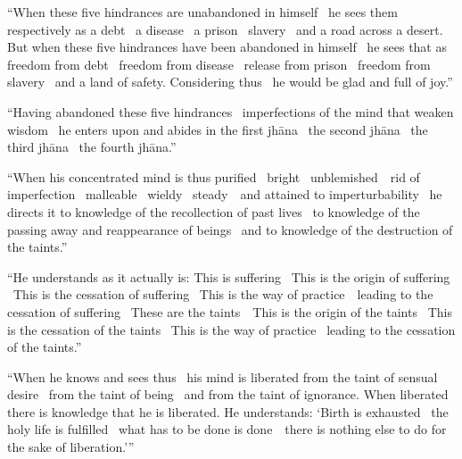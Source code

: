 \suttaRef{[MN 107]}

\begin{english-only-justify}
  ``When these five hindrances are unabandoned in himself \breathmark\ he sees them respectively as a debt \breathmark\ a disease \breathmark\ a prison \breathmark\ slavery \breathmark\ and a road across a desert. But when these five hindrances have been abandoned in himself \breathmark\ he sees that as freedom from debt \breathmark\ freedom from disease \breathmark\ release from prison \breathmark\ freedom from slavery \breathmark\ and a land of safety. Considering thus \breathmark\ he would be glad and full of joy.''
\end{english-only-justify}

\begin{english-only-justify}
  ``Having abandoned these five hindrances \breathmark\ imperfections of the mind that weaken wisdom \breathmark\ he enters upon and abides in the first jhāna \breathmark\ the second jhāna \breathmark\ the third jhāna \breathmark\ the fourth jhāna.''
\end{english-only-justify}

\begin{english-only-justify}
  ``When his concentrated mind is thus purified \breathmark\ bright \breathmark\ \mbox{unblemished}~\breathmark\ rid of imperfection \breathmark\ malleable \breathmark\ wieldy \breathmark\ \mbox{steady}~\breathmark\ and attained to imperturbability \breathmark\ he directs it to knowledge of the recollection of past lives \breathmark\ to knowledge of the passing away and reappearance of beings \breathmark\ and to knowledge of the destruction of the taints.''
\end{english-only-justify}

\begin{english-only-justify}
  ``He understands as it actually is: This is suffering \breathmark\ This is the origin of suffering \breathmark\ This is the cessation of suffering \breathmark\ This is the way of \mbox{practice}~\breathmark\ leading to the cessation of suffering \breathmark\ These are the \mbox{taints}~\breathmark\ This is the origin of the taints \breathmark\ This is the cessation of the taints \breathmark\ This is the way of practice \breathmark\ leading to the cessation of the taints.''
\end{english-only-justify}

\begin{english-only-justify}
  ``When he knows and sees thus \breathmark\ his mind is liberated from the taint of sensual desire \breathmark\ from the taint of being \breathmark\ and from the taint of ignorance. When liberated there is knowledge that he is liberated. He understands: `Birth is exhausted \breathmark\ the holy life is fulfilled \breathmark\ what has to be done is \mbox{done}~\breathmark\ there is nothing else to do for the sake of liberation.'''
\end{english-only-justify}

